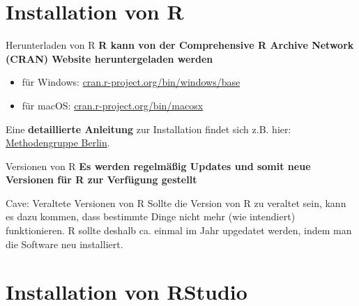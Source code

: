 \documentclass[11pt,ignorenonframetext,]{beamer}
\begin{document}
\hypertarget{installation-von-r}{%
\section{Installation von R}\label{installation-von-r}}

\begin{frame}{Herunterladen von R}
\protect\hypertarget{herunterladen-von-r}{}
\textbf{R kann von der Comprehensive R Archive Network (CRAN) Website
heruntergeladen werden}

\begin{itemize}
\item
  für Windows:
  \href{https://cran.r-project.org/bin/windows/base/}{cran.r-project.org/bin/windows/base}
\item
  für macOS:
  \href{https://cran.r-project.org/bin/macosx/}{cran.r-project.org/bin/macosx}
\end{itemize}

Eine \textbf{detaillierte Anleitung} zur Installation findet sich z.B.
hier:
\href{http://methods-berlin.com/wp-content/uploads/Installation.html}{Methodengruppe Berlin}.
\end{frame}

\begin{frame}[t]{Versionen von R}
\protect\hypertarget{versionen-von-r}{}
\textbf{Es werden regelmäßig Updates und somit neue Versionen für R zur
Verfügung gestellt}

\begin{exampleblock}{Cave: Veraltete Versionen von R}
  Sollte die Version von \textsf{R} zu veraltet sein, kann es dazu kommen, dass bestimmte Dinge nicht mehr (wie intendiert) funktionieren. R sollte deshalb ca. einmal im Jahr upgedatet werden, indem man die Software neu installiert.
\end{exampleblock}
\end{frame}

\hypertarget{installation-von-rstudio}{%
\section{Installation von RStudio}\label{installation-von-rstudio}}
\end{document}
